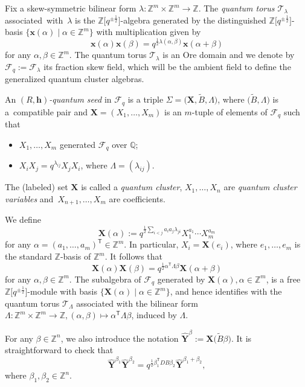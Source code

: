 \documentclass[11pt]{article}
\numberwithin{equation}{section}
\newcommand{\Z}{\mathbb{Z}}
\numberwithin{equation}{section}
\begin{document}
 Fix a skew-symmetric bilinear form $\lambda\colon\mathbb{Z}^{m}\times \mathbb{Z}^m\to \mathbb{Z}$. The {\it quantum torus $\mathcal{T}_\lambda$} associated~with~$\lambda$ is the $\mathbb{Z}\big[q^{\pm\frac{1}{2}}\big]$-algebra generated by the distinguished $\mathbb{Z}\big[q^{\pm\frac{1}{2}}\big]$-basis $\{\mathbf{x}(\alpha)\mid \alpha\in \mathbb{Z}^m\}$ with multiplication given by
\[
\mathbf{x}(\alpha)\mathbf{x}(\beta)=q^{\frac{1}{2}\lambda(\alpha,\beta)}\mathbf{x}(\alpha+\beta)
\]
for any $\alpha,\beta\in \mathbb{Z}^m$. The quantum torus $\mathcal{T}_\lambda$ is an Ore domain and we denote by $\mathcal{F}_q:=\mathcal{F}_\lambda$ its fraction skew field, which will be the ambient field to define the generalized quantum cluster algebras.
\begin{Definition}
 An {\it $(R,\mathbf{h})$-quantum seed} in $\mathcal{F}_q$ is a triple $\Sigma=\bigl(\mathbf{X},\tilde{B},\Lambda\bigr)$, where $\bigl(\tilde{B},\Lambda\bigr)$ is a~compatible pair and $\mathbf{X}=(X_1,\dots, X_m)$ is an $m$-tuple of elements of $\mathcal{F}_q$ such that
 \begin{itemize}\itemsep=0pt
 \item $X_1,\dots, X_{m}$ generated $\mathcal{F}_q$ over $\mathbb{Q}$;
 \item $X_iX_j=q^{\lambda_{ij}}X_jX_i$, where $\Lambda=(\lambda_{ij})$.
 \end{itemize}
 The (labeled) set $\mathbf{X}$ is called a {\it quantum cluster}, $X_1,\dots, X_n$ are {\it quantum cluster variables} and~${X_{n+1},\dots, X_m}$ are coefficients.
\end{Definition}
We define \[\mathbf{X}(\alpha):=q^{\frac{1}{2}\sum_{i<j}a_ia_j\lambda_{ji}}X_1^{a_1}\cdots X_{m}^{a_{m}}\] for any $\alpha=(a_1,\dots, a_{m})^{\mathsf T}\in \mathbb{Z}^{m}$. In particular, $X_i=\mathbf{X}(e_i)$, where $e_1,\dots, e_m$ is the standard $\Z$-basis of $\Z^m$.
It follows that
 \[
 \mathbf{X}(\alpha) \mathbf{X}(\beta)=q^{\frac{1}{2}\alpha^{\mathsf T}\Lambda \beta}\mathbf{X}({\alpha+\beta})
 \]
 for any $\alpha,\beta\in \Z^{m}$. The subalgebra of $\mathcal{F}_q$ generated by $\mathbf{X}(\alpha), \alpha\in \Z^{m}$, is a free $\Z\big[q^{\pm\frac{1}{2}}\big]$-module with basis $\{\mathbf{X}(\alpha) \mid \alpha\in \Z^{m}\}$, and hence identifies with the quantum torus $\mathcal{T}_\Lambda$ associated with the bilinear form $\Lambda\colon\Z^m\times \Z^m\to \Z, (\alpha,\beta)\mapsto \alpha^{\mathsf T}\Lambda \beta$, induced by $\Lambda$.

 For any $\beta\in \Z^n$, we also introduce the notation
$
 \hat{\mathbf{Y}}^{\beta}:=\mathbf{X}\bigl(\tilde{B}\beta\bigr)$.
 It is straightforward to check that
 \[
 \hat{\mathbf{Y}}^{\beta_1}\hat{\mathbf{Y}}^{\beta_2}=q^{\frac{1}{2}\beta_1^{\mathsf T}DB\beta_2}\hat{\mathbf{Y}}^{\beta_1+\beta_2},
 \]
 where $\beta_1,\beta_2\in \Z^n$.
\end{document}
